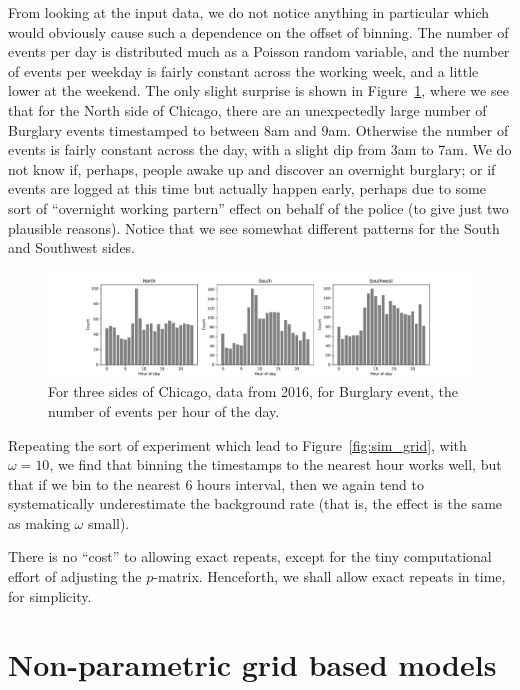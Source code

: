 \documentclass[twoside,a4paper]{article}
\theoremstyle{plain}
\theoremstyle{definition}
\begin{document}
From looking at the input data, we do not notice anything in particular which would
obviously cause such a dependence on the offset of binning.  The number of events per day
is distributed much as a Poisson random variable, and the number of events per weekday
is fairly constant across the working week, and a little lower at the weekend.  The
only slight surprise is shown in Figure~\ref{fig:by_hour_of_day}, where we see that
for the North side of Chicago, there
are an unexpectedly large number of Burglary events timestamped to between 8am and 9am.
Otherwise the number of events is fairly constant across the day, with a slight dip
from 3am to 7am.  We do not know if, perhaps, people awake up and discover an overnight
burglary; or if events are logged at this time but actually happen early, perhaps due
to some sort of ``overnight working partern'' effect on behalf of the police (to give
just two plausible reasons).  Notice that we see somewhat different patterns for the
South and Southwest sides.

\begin{figure}
  \includegraphics[width=\textwidth]{../notebooks/events_by_hour.pdf}
  \caption{For three sides of Chicago, data from 2016, for Burglary event,
the number of events per hour of the day.}
  \label{fig:by_hour_of_day}
\end{figure}

Repeating the sort of experiment which lead to Figure~\ref{fig:sim_grid}, with $\omega=10$,
we find that binning the timestamps to the nearest hour works well, but that if we bin to
the nearest 6 hours interval, then we again tend to systematically underestimate the
background rate (that is, the effect is the same as making $\omega$ small).

There is no ``cost'' to allowing exact repeats, except for the tiny computational effort
of adjusting the $p$-matrix.  Henceforth, we shall allow exact repeats in time, for simplicity.





\section{Non-parametric grid based models}\label{sec:non_param_grid}
\end{document}
